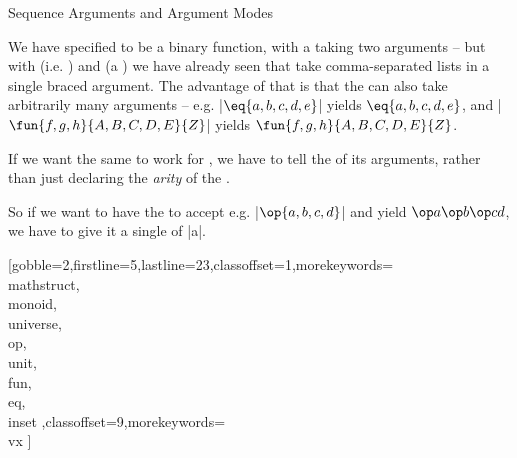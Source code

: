 \documentclass[lang={en,de}]{stex}
\begin{document}
  \begin{sfragment}{Sequence Arguments and Argument Modes}


    We have specified  to be a binary function, with a
     taking two arguments -- but with 
    (i.e. )
    and  (a )
    we have already seen  that take
    comma-separated lists in a single braced argument. The advantage
    of that is that the  can also take arbitrarily
    many arguments -- e.g. |$\eq{a,b,c,d,e}$| yields $\eq{a,b,c,d,e}$,
    and |$\fun{f,g,h}{A,B,C,D,E}{Z}$| yields $\fun{f,g,h}{A,B,C,D,E}{Z}$.


    If we want the same to work for , we have to tell 
    the  of its arguments, rather than just declaring 
    the \emph{arity}
    of the .


    So if we want to have the 
      to accept e.g. |$\op{a,b,c,d}$|
    and yield $\op a{\op b{\op cd}}$, we have to give it a single 
    of  |a|.

    [gobble=2,firstline=5,lastline=23,classoffset=1,morekeywords={
    \\mathstruct,\\monoid,\\universe,\\op,\\unit,\\fun,\\eq,\\inset
    },classoffset=9,morekeywords={
      \\vx
    }]
  
  \end{sfragment}
\end{document}
